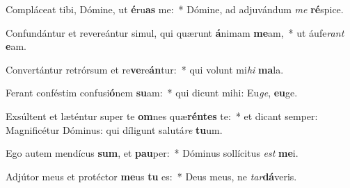 \item Compláceat tibi, Dómine, ut \textbf{é}ru\textbf{as} me:~* Dómine, ad adjuvándum \textit{me} \textbf{ré}spice.
\item Confundántur et revereántur simul, qui quærunt \textbf{á}nimam \textbf{me}am,~* ut áufe\textit{rant} \textbf{e}am.
\item Convertántur retrórsum et re\textbf{ve}re\textbf{án}tur:~* qui volunt mi\textit{hi} \textbf{ma}la.
\item Ferant conféstim confusi\textbf{ó}nem \textbf{su}am:~* qui dicunt mihi: Eu\textit{ge}, \textbf{eu}ge.
\item Exsúltent et læténtur super te \textbf{om}nes quæ\textbf{rén}\textbf{tes} te:~* et dicant semper: Magnificétur Dóminus: qui díligunt salutá\textit{re} \textbf{tu}um.
\item Ego autem mendícus \textbf{sum}, et \textbf{pau}per:~* Dóminus sollícitus \textit{est} \textbf{me}i.
\item Adjútor meus et protéctor \textbf{me}us \textbf{tu} es:~* Deus meus, ne \textit{tar}\textbf{dá}veris.
